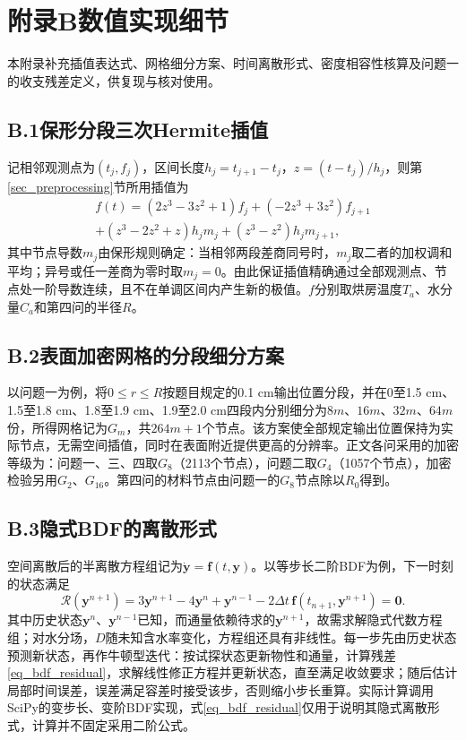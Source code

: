 \section*{附录B\quad 数值实现细节}

本附录补充插值表达式、网格细分方案、时间离散形式、密度相容性核算及问题一的收支残差定义，供复现与核对使用。

\subsection*{B.1\quad 保形分段三次Hermite插值}
记相邻观测点为$(t_j,f_j)$，区间长度$h_j=t_{j+1}-t_j$，$z=(t-t_j)/h_j$，则第\ref{sec_preprocessing}节所用插值为
\begin{equation}\label{eq_pchip}
\begin{gathered}
f(t)=(2z^3-3z^2+1)f_j+(-2z^3+3z^2)f_{j+1}\\
+(z^3-2z^2+z)h_jm_j+(z^3-z^2)h_jm_{j+1},
\end{gathered}
\end{equation}
其中节点导数$m_j$由保形规则确定：当相邻两段差商同号时，$m_j$取二者的加权调和平均；异号或任一差商为零时取$m_j=0$。由此保证插值精确通过全部观测点、节点处一阶导数连续，且不在单调区间内产生新的极值。$f$分别取烘房温度$T_a$、水分量$C_a$和第四问的半径$R$。

\subsection*{B.2\quad 表面加密网格的分段细分方案}
以问题一为例，将$0\le r\le R$按题目规定的0.1 cm输出位置分段，并在0至1.5 cm、1.5至1.8 cm、1.8至1.9 cm、1.9至2.0 cm四段内分别细分为$8m$、$16m$、$32m$、$64m$份，所得网格记为$G_m$，共$264m+1$个节点。该方案使全部规定输出位置保持为实际节点，无需空间插值，同时在表面附近提供更高的分辨率。正文各问采用的加密等级为：问题一、三、四取$G_8$（2113个节点），问题二取$G_4$（1057个节点），加密检验另用$G_2$、$G_{16}$。第四问的材料节点由问题一的$G_8$节点除以$R_0$得到。

\subsection*{B.3\quad 隐式BDF的离散形式}
空间离散后的半离散方程组记为$\dot{\boldsymbol y}=\boldsymbol f(t,\boldsymbol y)$。以等步长二阶BDF为例，下一时刻的状态满足
\begin{equation}\label{eq_bdf_residual}
\boldsymbol{\mathcal R}(\boldsymbol y^{n+1})
=3\boldsymbol y^{n+1}-4\boldsymbol y^n+\boldsymbol y^{n-1}
-2\Delta t\,\boldsymbol f(t_{n+1},\boldsymbol y^{n+1})
=\boldsymbol0.
\end{equation}
其中历史状态$\boldsymbol y^n$、$\boldsymbol y^{n-1}$已知，而通量依赖待求的$\boldsymbol y^{n+1}$，故需求解隐式代数方程组；对水分场，$D$随未知含水率变化，方程组还具有非线性。每一步先由历史状态预测新状态，再作牛顿型迭代：按试探状态更新物性和通量，计算残差\eqref{eq_bdf_residual}，求解线性修正方程并更新状态，直至满足收敛要求；随后估计局部时间误差，误差满足容差时接受该步，否则缩小步长重算。实际计算调用SciPy的变步长、变阶BDF实现，式\eqref{eq_bdf_residual}仅用于说明其隐式离散形式，计算并不固定采用二阶公式。


